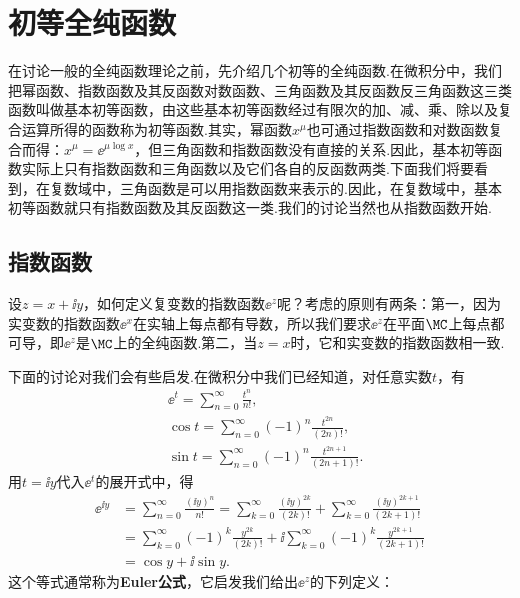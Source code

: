 \section{初等全纯函数\label{sec2.4}}
在讨论一般的全纯函数理论之前，先介绍几个初等的全纯函数.在微积分中，我们把幂函数、指数函数及其反函数对数函数、三角函数及其反函数反三角函数这三类函数叫做基本初等函数，由这些基本初等函数经过有限次的加、减、乘、除以及复合运算所得的函数称为初等函数.其实，幂函数$x^\mu$也可通过指数函数和对数函数复合而得：$x^\mu=\ee^{\mu\log x}$，但三角函数和指数函数没有直接的关系.因此，基本初等函数实际上只有指数函数和三角函数以及它们各自的反函数两类.下面我们将要看到，在复数域中，三角函数是可以用指数函数来表示的.因此，在复数域中，基本初等函数就只有指数函数及其反函数这一类.我们的讨论当然也从指数函数开始.

\subsection{指数函数}
设$z=x+\ii y$，如何定义复变数的指数函数$\ee^{z}$呢？考虑的原则有两条：第一，因为实变数的指数函数$\ee^x$在实轴上每点都有导数，所以我们要求$\ee^z$在平面$\MC$上每点都可导，即$\ee^z$是$\MC$上的全纯函数.第二，当$z=x$时，它和实变数的指数函数相一致.

下面的讨论对我们会有些启发.在微积分中我们已经知道，对任意实数$t$，有
\begin{align*}
  & \ee^t = \sum_{n=0}^\infty \frac{t^n}{n!},\\
  & \cos t = \sum_{n=0}^\infty(-1)^n\frac{t^{2n}}{(2n)!},\\
  & \sin t = \sum_{n=0}^\infty(-1)^n\frac{t^{2n+1}}{(2n+1)!}.
\end{align*}
用$t=\ii y$代入$\ee^t$的展开式中，得
\begin{align*}
  \ee^{\ii y} & = \sum_{n=0}^\infty\frac{(\ii y)^n}{n!} = \sum_{k=0}^\infty\frac{(\ii y)^{2k}}{(2k)!} + \sum_{k=0}^\infty\frac{(\ii y)^{2k+1}}{(2k+1)!}\\
  & = \sum_{k=0}^\infty(-1)^k\frac{y^{2k}}{(2k)!} +
   \ii\sum_{k=0}^\infty(-1)^k\frac{y^{2k+1}}{(2k+1)!}\\
  & = \cos y+\ii\sin y.
\end{align*}
这个等式通常称为\textbf{Euler公式}，它启发我们给出$\ee^z$的下列定义：

